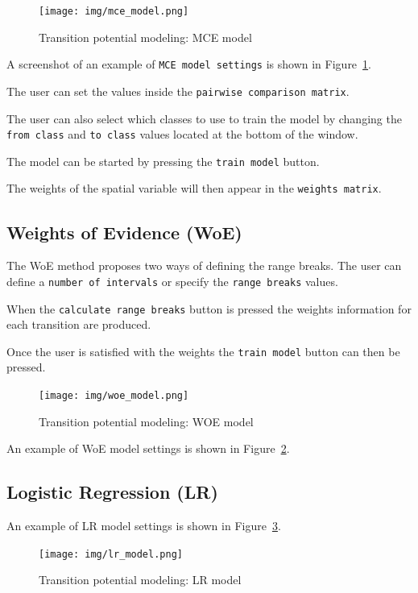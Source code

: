 \documentclass{report}
\begin{document}
\begin{figure}[h!]
\centering
\texttt{[image: img/mce\_model.png]}
\caption{Transition potential modeling: MCE model}
\label{fig:mce_model}
\end{figure}

A screenshot of an example of \verb+MCE model settings+ is shown in Figure~\ref{fig:mce_model}.

The user can set the values inside the \verb+pairwise comparison matrix+. 

The user can also select which classes to use to train the model by changing the \verb+from class+ 
and \verb+to class+ values located at the bottom of the window.


The model can be started by pressing the \verb+train model+ button.

The weights of the spatial variable will then appear in the \verb+weights matrix+.


\subsection{Weights of Evidence (WoE)}
The WoE \cite{bonham1989weights} method proposes two ways of defining the range breaks. 
The user can define a \verb+number of intervals+ or specify the 
\verb+range breaks+ values.

When the \verb+calculate range breaks+ button is pressed the weights information for each transition are
produced.

Once the user is satisfied with the weights the \verb+train model+ button can then be pressed.

\begin{figure}[h!]
\centering
\texttt{[image: img/woe\_model.png]}
\caption{Transition potential modeling: WOE model}
\label{fig:woe_model}
\end{figure}

An example of WoE model settings is shown in Figure~\ref{fig:woe_model}.

\subsection{Logistic Regression (LR)}

An example of LR model settings is shown in Figure~\ref{fig:lr_model}.

\begin{figure}[h!]
\centering
\texttt{[image: img/lr\_model.png]}
\caption{Transition potential modeling: LR model}
\label{fig:lr_model}
\end{figure}
\end{document}
